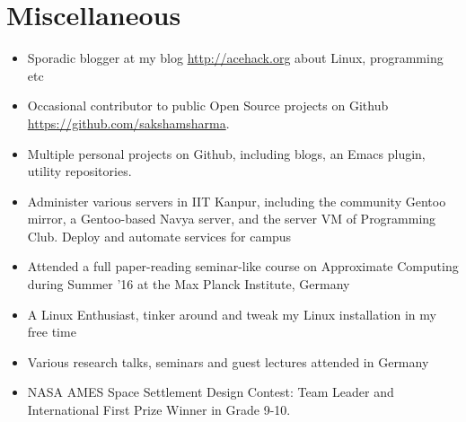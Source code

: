 \documentclass[11pt,a4paper]{moderncv}
\begin{document}
\section*{Miscellaneous}
\begin{itemize}
  \item Sporadic blogger at my blog \url{http://acehack.org} about Linux, programming etc
  \item Occasional contributor to public Open Source projects on Github
    \url{https://github.com/sakshamsharma}.
  \item Multiple personal projects on Github, including blogs, an
    Emacs plugin, utility repositories.
  \item	Administer various servers in IIT Kanpur, including the
    community Gentoo mirror, a Gentoo-based Navya server, and the
    server VM of Programming Club. Deploy and automate services for
    campus
  \item Attended a full paper-reading seminar-like course on
    Approximate Computing during Summer ’16 at the Max Planck
    Institute, Germany
  \item A Linux Enthusiast, tinker around and tweak my Linux installation in my 
free time
  \item Various research talks, seminars and guest lectures attended
    in Germany
  \item NASA AMES Space Settlement Design Contest: Team Leader and International First Prize Winner in Grade 9-10.
\end{itemize}
\end{document}
